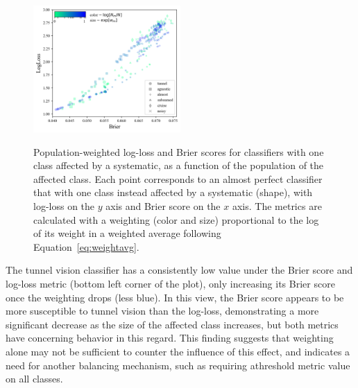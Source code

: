 \begin{figure}
	\begin{center}
		\label{fig:popweight}
		\includegraphics[width=0.5\textwidth]{./fig/all_effects_isolated.png}
		\caption{Population-weighted log-loss and Brier scores for classifiers with one class affected by a systematic, as a function of the population of the affected class.
		Each point corresponds to an almost perfect classifier that with one class instead affected by a systematic (shape), with log-loss on the $y$ axis and Brier score on the $x$ axis.
		The metrics are calculated with a weighting (color and size) proportional to the log of its weight in a weighted average following Equation~\ref{eq:weightavg}.
		}
	\end{center}
\end{figure}

The tunnel vision classifier has a consistently low value under the Brier score and log-loss metric (bottom left corner of the plot), only increasing its Brier score once the weighting drops (less blue).
In this view, the Brier score appears to be more susceptible to tunnel vision than the log-loss, demonstrating a more significant decrease as the size of the affected class increases, but both metrics have concerning behavior in this regard.
This finding suggests that weighting alone may not be sufficient to counter the influence of this effect, and indicates a need for another balancing mechanism, such as requiring athreshold metric value on all classes.


